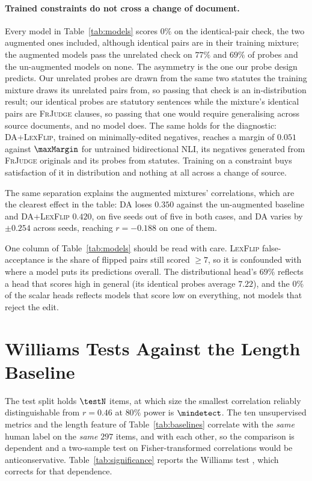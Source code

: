 \documentclass[11pt]{article}
\begin{document}
\paragraph{Trained constraints do not cross a change of document.}
Every model in Table~\ref{tab:models} scores $0\%$ on the identical-pair check,
the two augmented ones included, although identical pairs are in their training
mixture; the augmented models pass the unrelated check on $77\%$ and $69\%$ of
probes and the un-augmented models on none. The asymmetry is the one our probe
design predicts. Our unrelated probes are drawn from the same two statutes the
training mixture draws its unrelated pairs from, so passing that check is an
in-distribution result; our identical probes are statutory sentences while the
mixture's identical pairs are \textsc{FrJudge} clauses, so passing that one
would require generalising across source documents, and no model does. The same
holds for the diagnostic: \textsc{DA+LexFlip}, trained on minimally-edited
negatives, reaches a margin of $0.051$ against $\maxMargin$ for untrained
bidirectional NLI, its negatives generated from \textsc{FrJudge} originals and
its probes from statutes. Training on a constraint buys satisfaction of it in
distribution and nothing at all across a change of source.

The same separation explains the augmented mixtures' correlations, which are the
clearest effect in the table: \textsc{DA} loses $0.350$ against the un-augmented
baseline and \textsc{DA+LexFlip} $0.420$, on five seeds out of five in both
cases, and \textsc{DA} varies by $\pm0.254$ across seeds, reaching $r=-0.188$ on
one of them.

One column of Table~\ref{tab:models} should be read with care.
\textsc{LexFlip} false-acceptance is the share of flipped pairs still scored
$\geq 7$, so it is confounded with where a model puts its predictions overall.
The distributional head's $69\%$ reflects a head that scores high in general
(its identical probes average $7.22$), and the $0\%$ of the scalar heads
reflects models that score low on everything, not models that reject the edit.

\section{Williams Tests Against the Length Baseline}
\label{app:williams}

The test split holds $\testN$ items, at which size the smallest correlation
reliably distinguishable from $r=0.46$ at $80\%$ power is $\mindetect$.
The ten unsupervised metrics and the length feature of
Table~\ref{tab:baselines} correlate with the \emph{same} human label on the
\emph{same} $297$ items, and with each other, so the comparison is dependent and a two-sample test on
Fisher-transformed correlations would be anticonservative. Table~\ref{tab:significance}
reports the Williams test \citep{graham2014williams}, which corrects for that
dependence.
\end{document}
